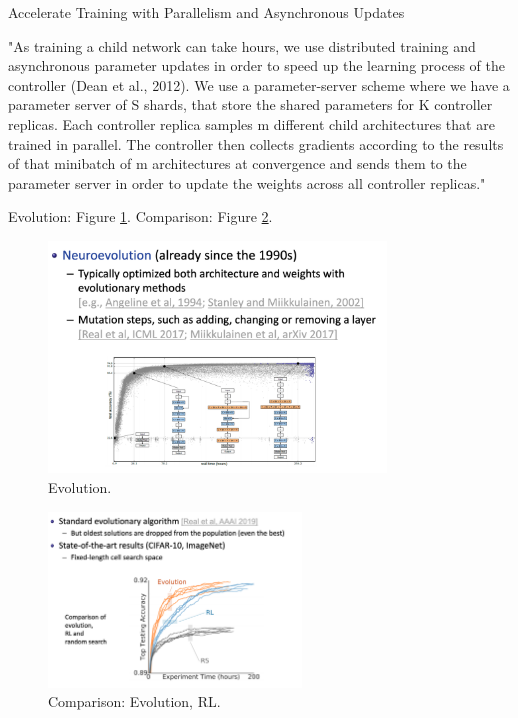 \documentclass[english]{article}
\begin{document}
\item Accelerate Training with Parallelism and Asynchronous Updates

"As training a child network can take hours, we use distributed training and
asynchronous parameter updates in order to speed up the learning process of the controller (Dean
et al., 2012). We use a parameter-server scheme where we have a parameter server of S shards, that
store the shared parameters for K controller replicas. Each controller replica samples m different
child architectures that are trained in parallel. The controller then collects gradients according to the
results of that minibatch of m architectures at convergence and sends them to the parameter server
in order to update the weights across all controller replicas."



\item Evolution: Figure \ref{nas8}. Comparison: Figure \ref{nas9}.


\begin{figure}[h!]
  \centering
  \includegraphics[width=0.8\textwidth]{nas8.png}
  \caption{Evolution.}
  \label{nas8}
\end{figure}


\begin{figure}[h!]
  \centering
  \includegraphics[width=0.6\textwidth]{nas9.png}
  \caption{Comparison: Evolution, RL.}
  \label{nas9}
\end{figure}
\end{document}
